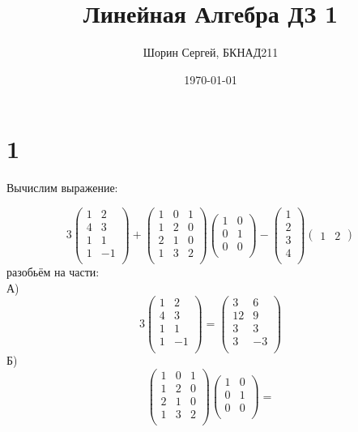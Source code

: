 \documentclass[a4paper]{article}
\author{Шорин Сергей, БКНАД211}
\title{Линейная Алгебра ДЗ 1}
\date{\today}
\begin{document}
\maketitle

\newpage

\section*{1}
Вычислим выражение:

\begin{equation*}
3
\begin{pmatrix}
1 &2\\
4&3\\
1&1\\
1&-1\\
\end{pmatrix} +
\begin{pmatrix}
  1&0&1\\
1&2&0\\
2&1&0\\
1&3&2\\
\end{pmatrix}
\begin{pmatrix}
 1&0\\
0&1\\
0&0\\
\end{pmatrix}
-
\begin{pmatrix}
 1\\
2\\
3\\
4\\
\end{pmatrix}
\begin{pmatrix}
1&2
\end{pmatrix}
\end{equation*}
разобьём на части: \\
А)
\begin{equation*}
3
\begin{pmatrix}
1 &2\\
4&3\\
1&1\\
1&-1\\
\end{pmatrix}  = 
\begin{pmatrix}
3 &6\\
12&9\\
3&3\\
3&-3\\
\end{pmatrix}
\end{equation*}
Б)
\begin{equation*}
\begin{pmatrix}
  1&0&1\\
1&2&0\\
2&1&0\\
1&3&2\\
\end{pmatrix}
\begin{pmatrix}
 1&0\\
0&1\\
0&0\\
\end{pmatrix} =
\end{equation*} 
\end{document}
